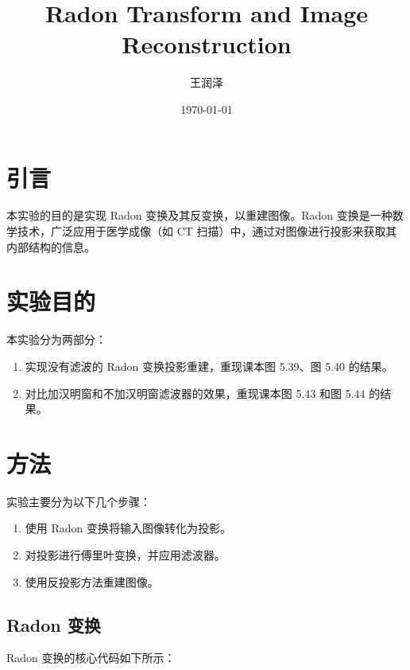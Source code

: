 \documentclass{article}
\title{Radon Transform and Image Reconstruction}
\author{王润泽}
\date{\today}
\begin{document}
\maketitle

\section{引言}
本实验的目的是实现 Radon 变换及其反变换，以重建图像。Radon 变换是一种数学技术，广泛应用于医学成像（如 CT 扫描）中，通过对图像进行投影来获取其内部结构的信息。

\section{实验目的}
本实验分为两部分：
\begin{enumerate}
    \item 实现没有滤波的 Radon 变换投影重建，重现课本图 5.39、图 5.40 的结果。
    \item 对比加汉明窗和不加汉明窗滤波器的效果，重现课本图 5.43 和图 5.44 的结果。
\end{enumerate}

\section{方法}
实验主要分为以下几个步骤：
\begin{enumerate}
    \item 使用 Radon 变换将输入图像转化为投影。
    \item 对投影进行傅里叶变换，并应用滤波器。
    \item 使用反投影方法重建图像。
\end{enumerate}

\subsection{Radon 变换}
Radon 变换的核心代码如下所示：
\end{document}
